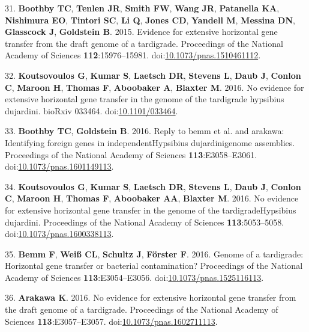 \documentclass[11pt,]{article}
\begin{document}
\hypertarget{ref-Boothby2015}{}
31. \textbf{Boothby TC}, \textbf{Tenlen JR}, \textbf{Smith FW},
\textbf{Wang JR}, \textbf{Patanella KA}, \textbf{Nishimura EO},
\textbf{Tintori SC}, \textbf{Li Q}, \textbf{Jones CD}, \textbf{Yandell
M}, \textbf{Messina DN}, \textbf{Glasscock J}, \textbf{Goldstein B}.
2015. Evidence for extensive horizontal gene transfer from the draft
genome of a tardigrade. Proceedings of the National Academy of Sciences
\textbf{112}:15976--15981.
doi:\href{https://doi.org/10.1073/pnas.1510461112}{10.1073/pnas.1510461112}.

\hypertarget{ref-Koutsovoulos2016a}{}
32. \textbf{Koutsovoulos G}, \textbf{Kumar S}, \textbf{Laetsch DR},
\textbf{Stevens L}, \textbf{Daub J}, \textbf{Conlon C}, \textbf{Maroon
H}, \textbf{Thomas F}, \textbf{Aboobaker A}, \textbf{Blaxter M}. 2016.
No evidence for extensive horizontal gene transfer in the genome of the
tardigrade hypsibius dujardini. bioRxiv 033464.
doi:\href{https://doi.org/10.1101/033464}{10.1101/033464}.

\hypertarget{ref-Boothby2016}{}
33. \textbf{Boothby TC}, \textbf{Goldstein B}. 2016. Reply to bemm et
al. and arakawa: Identifying foreign genes in independentHypsibius
dujardinigenome assemblies. Proceedings of the National Academy of
Sciences \textbf{113}:E3058--E3061.
doi:\href{https://doi.org/10.1073/pnas.1601149113}{10.1073/pnas.1601149113}.

\hypertarget{ref-Koutsovoulos2016b}{}
34. \textbf{Koutsovoulos G}, \textbf{Kumar S}, \textbf{Laetsch DR},
\textbf{Stevens L}, \textbf{Daub J}, \textbf{Conlon C}, \textbf{Maroon
H}, \textbf{Thomas F}, \textbf{Aboobaker AA}, \textbf{Blaxter M}. 2016.
No evidence for extensive horizontal gene transfer in the genome of the
tardigradeHypsibius dujardini. Proceedings of the National Academy of
Sciences \textbf{113}:5053--5058.
doi:\href{https://doi.org/10.1073/pnas.1600338113}{10.1073/pnas.1600338113}.

\hypertarget{ref-Bemm2016}{}
35. \textbf{Bemm F}, \textbf{Weiß CL}, \textbf{Schultz J},
\textbf{Förster F}. 2016. Genome of a tardigrade: Horizontal gene
transfer or bacterial contamination? Proceedings of the National Academy
of Sciences \textbf{113}:E3054--E3056.
doi:\href{https://doi.org/10.1073/pnas.1525116113}{10.1073/pnas.1525116113}.

\hypertarget{ref-Arakawa2016}{}
36. \textbf{Arakawa K}. 2016. No evidence for extensive horizontal gene
transfer from the draft genome of a tardigrade. Proceedings of the
National Academy of Sciences \textbf{113}:E3057--E3057.
doi:\href{https://doi.org/10.1073/pnas.1602711113}{10.1073/pnas.1602711113}.
\end{document}
